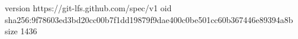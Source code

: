 version https://git-lfs.github.com/spec/v1
oid sha256:9f78603ed3bd20cc00b7f1dd19879f9dae400c0be501cc60b367446e89394a8b
size 1436
